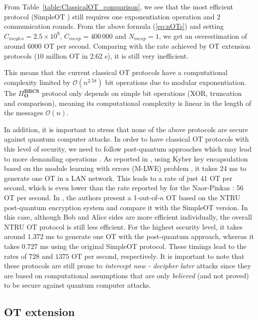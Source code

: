 From Table~\ref{table:ClassicalOT_comparison}, we see that the most efficient protocol (SimpleOT \cite{CO15}) still requires one exponentiation operation and $2$ communication rounds. From the above formula (\ref{eq:nOTs}) and setting $C_{mcyles} = 2.5 \times 10^9$, $C_{mexp} = 400\,000$ and $N_{mexp} = 1$, we get an overestimation of around $6 000$ OT per second. Comparing with the rate achieved by OT extension protocols ($10$ million OT in $2.62$ s), it is still very inefficient.

This means that the current classical OT protocols have a computational complexity limited by $\mathcal{O}(n^{2.58})$ bit operations due to modular exponentiation. The $\Pi^{\textbf{BBCS}}_{\textbf{O}}$ protocol only depends on simple bit operations (XOR, truncation and comparison), meaning its computational complexity is linear in the length of the messages $\mathcal{O}(n)$.

In addition, it is important to stress that none of the above protocols are secure against quantum computer attacks. In order to have classical OT protocols with this level of security, we need to follow post-quantum approaches which may lead to more demanding operations \cite{PST19}. As reported in \cite{MR19}, using Kyber key encapsulation based on the module learning with errors (M-LWE) problem \cite{CrystalKyber17}, it takes 24 ms to generate one OT in a LAN network. This leads to a rate of just 41 OT per second, which is even lower than the rate reported by \cite{ALSZ13} for the Naor-Pinkas \cite{NP01}: 56 OT per second. In \cite{NTRUOT1, NTRUOT2}, the authors present a 1-out-of-$n$ OT based on the NTRU post-quantum encryption system \cite{NTRU} and compare it with the SimpleOT \cite{CO15} version. In this case, although Bob and Alice sides are more efficient individually, the overall NTRU OT protocol is still less efficient. For the highest security level, it takes around $1.372$ ms to generate one OT with the post-quantum approach, whereas it takes $0.727$ ms using the original SimpleOT protocol. These timings lead to the rates of $728$ and $1375$ OT per second, respectively. It is important to note that these protocols are still prone to \textit{intercept now - decipher later} attacks since they are based on computational assumptions that are only \textit{believed} (and not proved) to be secure against quantum computer attacks.


\subsection{OT extension} \label{Ext-OT_comp}

